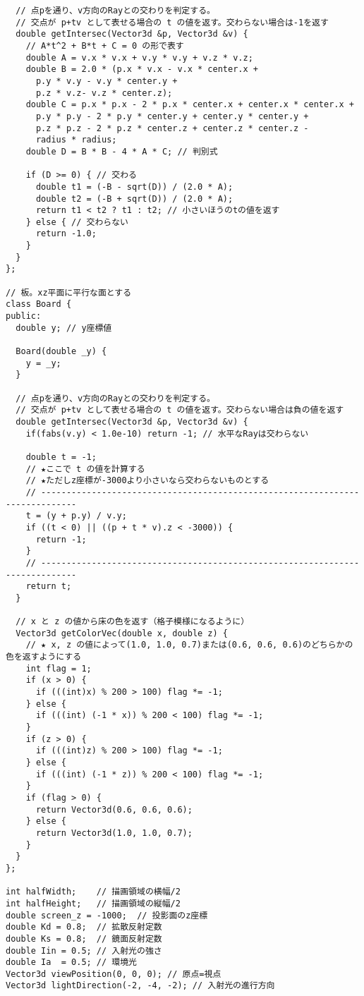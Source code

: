 \documentclass{scrartcl}
\begin{document}
\begin{verbatim}
  // 点pを通り、v方向のRayとの交わりを判定する。
  // 交点が p+tv として表せる場合の t の値を返す。交わらない場合は-1を返す
  double getIntersec(Vector3d &p, Vector3d &v) {
    // A*t^2 + B*t + C = 0 の形で表す
    double A = v.x * v.x + v.y * v.y + v.z * v.z;
    double B = 2.0 * (p.x * v.x - v.x * center.x +
      p.y * v.y - v.y * center.y +
      p.z * v.z- v.z * center.z);
    double C = p.x * p.x - 2 * p.x * center.x + center.x * center.x +
      p.y * p.y - 2 * p.y * center.y + center.y * center.y +
      p.z * p.z - 2 * p.z * center.z + center.z * center.z -
      radius * radius;
    double D = B * B - 4 * A * C; // 判別式

    if (D >= 0) { // 交わる
      double t1 = (-B - sqrt(D)) / (2.0 * A);
      double t2 = (-B + sqrt(D)) / (2.0 * A);
      return t1 < t2 ? t1 : t2; // 小さいほうのtの値を返す
    } else { // 交わらない
      return -1.0;
    }
  }
};

// 板。xz平面に平行な面とする
class Board {
public:
  double y; // y座標値

  Board(double _y) {
    y = _y;
  }

  // 点pを通り、v方向のRayとの交わりを判定する。
  // 交点が p+tv として表せる場合の t の値を返す。交わらない場合は負の値を返す
  double getIntersec(Vector3d &p, Vector3d &v) {
    if(fabs(v.y) < 1.0e-10) return -1; // 水平なRayは交わらない

    double t = -1;
    // ★ここで t の値を計算する
    // ★ただしz座標が-3000より小さいなら交わらないものとする
    // -----------------------------------------------------------------------------
    t = (y + p.y) / v.y;
    if ((t < 0) || ((p + t * v).z < -3000)) {
      return -1;
    }
    // -----------------------------------------------------------------------------
    return t;
  }

  // x と z の値から床の色を返す（格子模様になるように）
  Vector3d getColorVec(double x, double z) {
    // ★ x, z の値によって(1.0, 1.0, 0.7)または(0.6, 0.6, 0.6)のどちらかの色を返すようにする
    int flag = 1;
    if (x > 0) {
      if (((int)x) % 200 > 100) flag *= -1;
    } else {
      if (((int) (-1 * x)) % 200 < 100) flag *= -1;
    }
    if (z > 0) {
      if (((int)z) % 200 > 100) flag *= -1;
    } else {
      if (((int) (-1 * z)) % 200 < 100) flag *= -1;
    }
    if (flag > 0) {
      return Vector3d(0.6, 0.6, 0.6);
    } else {
      return Vector3d(1.0, 1.0, 0.7);
    }
  }
};

int halfWidth;    // 描画領域の横幅/2
int halfHeight;   // 描画領域の縦幅/2
double screen_z = -1000;  // 投影面のz座標
double Kd = 0.8;  // 拡散反射定数
double Ks = 0.8;  // 鏡面反射定数
double Iin = 0.5; // 入射光の強さ
double Ia  = 0.5; // 環境光
Vector3d viewPosition(0, 0, 0); // 原点=視点
Vector3d lightDirection(-2, -4, -2); // 入射光の進行方向



\end{verbatim}
\end{document}
